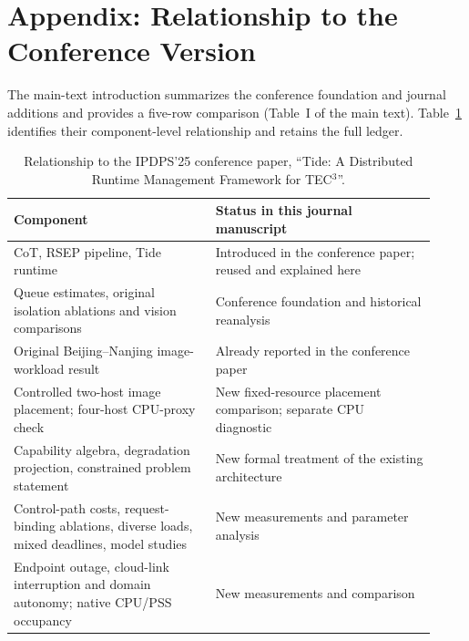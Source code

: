 \section*{Appendix: Relationship to the Conference Version}
The main-text introduction summarizes the conference foundation and journal additions and provides a five-row comparison (Table~I of the main text). Table~\ref{tab:conference-diff} identifies their component-level relationship and retains the full ledger.

\begin{table}[htbp]
\centering\small
\caption{Relationship to the IPDPS'25 conference paper, ``Tide: A Distributed Runtime Management Framework for TEC$^3$''. }
\label{tab:conference-diff}
\begin{tabular}{p{0.44\linewidth}p{0.48\linewidth}}
\toprule
Component & Status in this journal manuscript\\
\midrule
CoT, RSEP pipeline, Tide runtime & Introduced in the conference paper; reused and explained here\\
Queue estimates, original isolation ablations and vision comparisons & Conference foundation and historical reanalysis\\
Original Beijing--Nanjing image-workload result & Already reported in the conference paper\\
Controlled two-host image placement; four-host CPU-proxy check & New fixed-resource placement comparison; separate CPU diagnostic\\
Capability algebra, degradation projection, constrained problem statement & New formal treatment of the existing architecture\\
Control-path costs, request-binding ablations, diverse loads, mixed deadlines, model studies & New measurements and parameter analysis\\
Endpoint outage, cloud-link interruption and domain autonomy; native CPU/PSS occupancy & New measurements and comparison\\
\bottomrule
\end{tabular}
\end{table}
